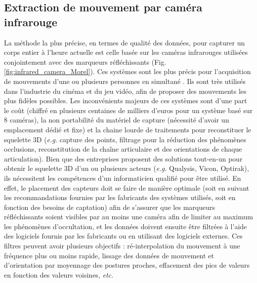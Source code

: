 \subsection{Extraction de mouvement par caméra infrarouge}
La méthode la plus précise, en termes de qualité des données, pour capturer un corps entier à l'heure actuelle est celle basée sur les caméras infrarouges utilisées conjointement avec des marqueurs réfléchissants (Fig. \ref{fig:infrared_camera_Morel}). Ces systèmes sont les plus précis pour l'acquisition de mouvements d'une ou plusieurs personnes en simultané \parencite{Pfister2014Cao} \parencite{Yang2016HUL}. Ils sont très utilisés dans l'industrie du cinéma et du jeu vidéo, afin de proposer des mouvements les plus fidèles possibles. Les inconvénients majeurs de ces systèmes sont d'une part le coût (chiffré en plusieurs centaines de milliers d'euros pour un système basé sur 8 caméras), la non portabilité du matériel de capture (nécessité d'avoir un emplacement dédié et fixe) et la chaine lourde de traitements pour reconstituer le squelette 3D (\textit{e.g.} capture des points, filtrage pour la réduction des phénomènes occlusions, reconstitution de la chaîne articulaire et des orientations de chaque articulation). Bien que des entreprises proposent des solutions tout-en-un pour obtenir le squelette 3D d'un ou plusieurs acteurs (\textit{e.g.} Qualysis, Vicon, Optirak), ils nécessitent les compétences d'un informaticien qualifié pour être utilisé. En effet, le placement des capteurs doit se faire de manière optimale (soit en suivant les recommandations fournies par les fabricants des systèmes utilisés, soit en fonction des besoins de captation) afin de s'assurer que les marqueurs réfléchissants soient visibles par au moins une caméra afin de limiter au maximum les phénomènes d'occultation, et les données doivent ensuite être filtrées à l'aide des logiciels fournis par les fabricants ou en utilisant des logiciels externes. Ces filtres peuvent avoir plusieurs objectifs : ré-interpolation du mouvement à une fréquence plus ou moins rapide, lissage des données de mouvement et d'orientation par moyennage des postures proches, effacement des pics de valeurs en fonction des valeurs voisines, \textit{etc.}

